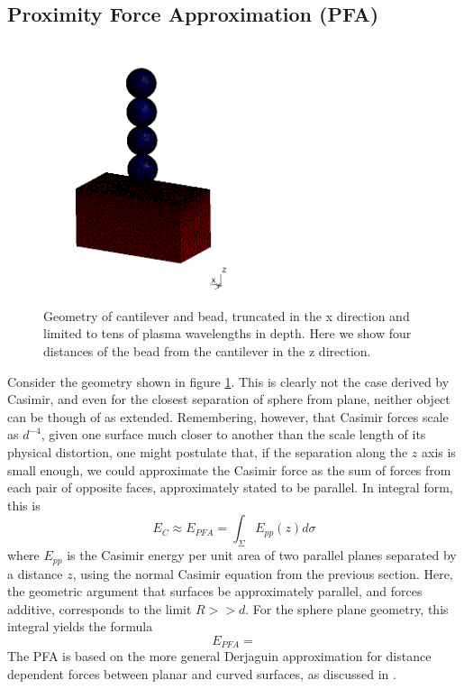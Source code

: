 \documentclass[11pt,traditabstract]{article}
\begin{document}
\subsection{Proximity Force Approximation (PFA)}

\begin{figure}[!h]
\centering
\includegraphics[height=3in]{geometry}
\caption{Geometry of cantilever and bead, truncated in the x direction and limited to tens of plasma wavelengths in depth. Here we show four distances of the bead from the cantilever in the z direction.}\label{fig:geo}
\end{figure}

Consider the geometry shown in figure \ref{fig:geo}. This is clearly not the case derived by Casimir, and even for the closest separation of sphere from plane, neither object can be though of as extended. Remembering, however, that Casimir forces scale as $d^{-4}$, given one surface much closer to another than the scale length of its physical distortion, one might postulate that, if the separation along the $z$ axis is small enough, we could approximate the Casimir force as the sum of forces from each pair of opposite faces, approximately stated to be parallel. In integral form, this is \citep{Dexp}
$$
E_{C}\approx E_{PFA}=\int_{\Sigma}E_{pp}(z)d\sigma
$$
where $E_{pp}$ is the Casimir energy per unit area of two parallel planes separated by a distance $z$, using the normal Casimir equation from the previous section. Here, the geometric argument that surfaces be approximately parallel, and forces additive, corresponds to the limit $R>>d$. For the sphere plane geometry, this integral yields the formula
$$
E_{PFA}=
$$
The PFA is based on the more general Derjaguin approximation for distance dependent forces between planar and curved surfaces, as discussed in \citet{BeyondPFA}. 
\end{document}
